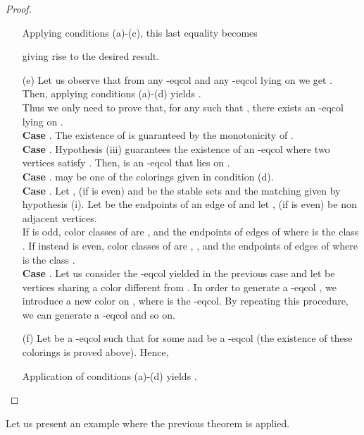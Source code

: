 \begin{proof}
\begin{enumerate}
Applying conditions (a)-(c), this last equality becomes

giving rise to the desired result.
\item[(e)] Let us observe that from any -eqcol  and any -eqcol
 lying on  we get .
Then, applying conditions (a)-(d) yields .\\
Thus we only need to prove that, for any  such that , there exists an -eqcol 
lying on .\\
\textbf{Case }. The existence of  is guaranteed by the monotonicity of .\\
\textbf{Case }. Hypothesis (iii) guarantees the existence of an -eqcol 
where two vertices  satisfy . Then,  is an -eqcol that lies
on .\\
\textbf{Case }.  may be one of the colorings given in condition (d).\\
\textbf{Case }. Let ,  (if  is even) and  be the stable sets and the matching
given by hypothesis (i). Let  be the endpoints of an edge of  and let ,  (if 
is even) be non adjacent vertices.\\
If  is odd, color classes of  are ,  and the endpoints of edges of  where
 is the class . If instead  is even, color classes of  are , ,
 and the endpoints of edges of  where  is the class .\\
\textbf{Case }. Let us consider the -eqcol yielded in the
previous case and let  be vertices sharing a color different from .
In order to generate a -eqcol , we introduce a new color on , \ie 
where  is the -eqcol. By repeating this procedure, we can generate a
-eqcol and so on.
\item[(f)] Let  be a -eqcol such that  for some  and
 be a -eqcol (the existence of these colorings is proved above). Hence,

Application of conditions (a)-(d) yields .
\end{enumerate}
\end{proof}

Let us present an example where the previous theorem is applied.\\


